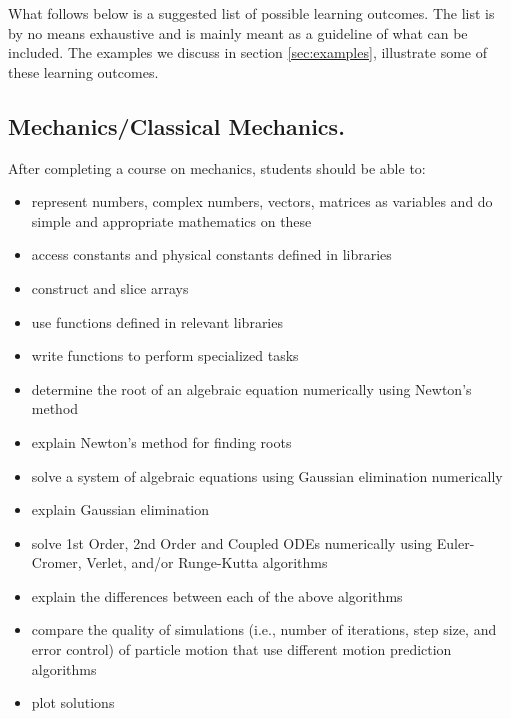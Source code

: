 \documentclass[graybox,envcountchap,sectrefs]{svmult}
\begin{document}
What follows below is a suggested list of possible learning
outcomes. The list is by no means exhaustive and is mainly meant as a
guideline of what can be included. The examples we discuss in section \ref{sec:examples}, illustrate some of these learning outcomes.


\subsection{Mechanics/Classical Mechanics.}
After completing a course on mechanics, students should be able to:
\begin{itemize}
\item represent numbers, complex numbers, vectors, matrices as variables and do simple and appropriate mathematics on these

\item access constants and physical constants defined in libraries

\item construct and slice arrays

\item use functions defined in relevant libraries

\item write functions to perform specialized tasks

\item determine the root of an algebraic equation numerically using Newton's method

\item explain Newton's method for finding roots

\item solve a system of algebraic equations using Gaussian elimination numerically

\item explain Gaussian elimination

\item solve 1st Order, 2nd Order and Coupled ODEs numerically using Euler-Cromer, Verlet, and/or Runge-Kutta algorithms

\item explain the differences between each of the above algorithms

\item compare the quality of simulations (i.e., number of iterations, step size, and error control) of particle motion that use different motion prediction algorithms

\item plot solutions
\end{itemize}
\end{document}
